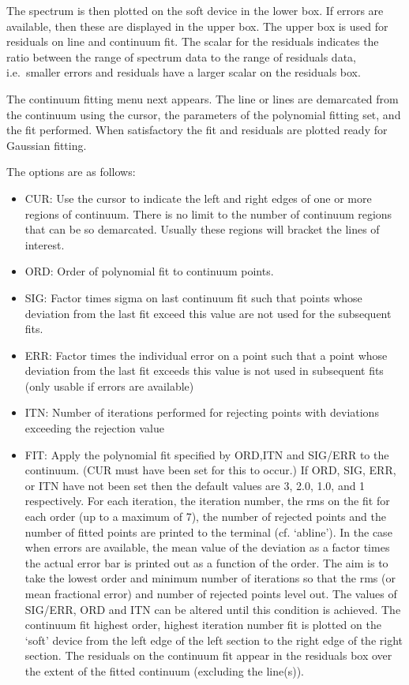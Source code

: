 \documentclass[11pt,twoside]{article}
\newcommand{\htmlref}[2]{#1}
\begin{document}
   The spectrum is then plotted on the soft device in the lower box. If
   errors are available, then these are displayed in the upper box. The
   upper box is used for residuals on line and continuum fit. The scalar
   for the residuals indicates the ratio between the range of spectrum
   data to the range of residuals data, i.e.\ smaller errors and
   residuals have a larger scalar on the residuals box.

   The continuum fitting menu next appears. The line or lines are
   demarcated from the continuum using the cursor, the parameters of the
   polynomial fitting set, and the fit performed. When satisfactory the
   fit and residuals are plotted ready for Gaussian fitting.

   The options are as follows:

\begin{itemize}
\item
   CUR: Use the cursor to indicate the left and right edges of one or
   more regions of continuum.  There is no limit to the number of
   continuum regions that can be so demarcated.  Usually these regions
   will bracket the lines of interest.

\item
   ORD: Order of polynomial fit to continuum points.

\item
   SIG: Factor times sigma on last continuum fit such that points
   whose deviation from the last fit exceed this value are not used for
   the subsequent fits.

\item
   ERR: Factor times the individual error on a point such that a
   point whose deviation from the last fit exceeds this value is not
   used in subsequent fits (only usable if errors are available)

\item
   ITN: Number of iterations performed for rejecting points with
   deviations exceeding the rejection value

\item
   FIT: Apply the polynomial fit specified by ORD,ITN and SIG/ERR to
   the continuum.  (CUR must have been set for this to occur.) If ORD,
   SIG, ERR, or ITN have not been set then the default values are 3,
   2.0, 1.0, and 1 respectively.  For each iteration, the iteration
   number, the rms on the fit for each order (up to a maximum of 7), the
   number of rejected points and the number of fitted points are printed
   to the terminal (cf.
\htmlref{`abline').}{techno11}
   In the case when errors are available,
   the mean value of the deviation as a factor times the actual error
   bar is printed out as a function of the order. The aim is to take the
   lowest order and minimum number of iterations so that the rms (or
   mean fractional error) and number of rejected points level out. The
   values of SIG/ERR, ORD and ITN can be altered until this condition is
   achieved. The continuum fit highest order, highest iteration number
   fit is plotted on the `soft' device from the left edge of the left
   section to the right edge of the right section. The residuals on the
   continuum fit appear in the residuals box over the extent of the
   fitted continuum (excluding the line(s)).


\end{itemize}
\end{document}
